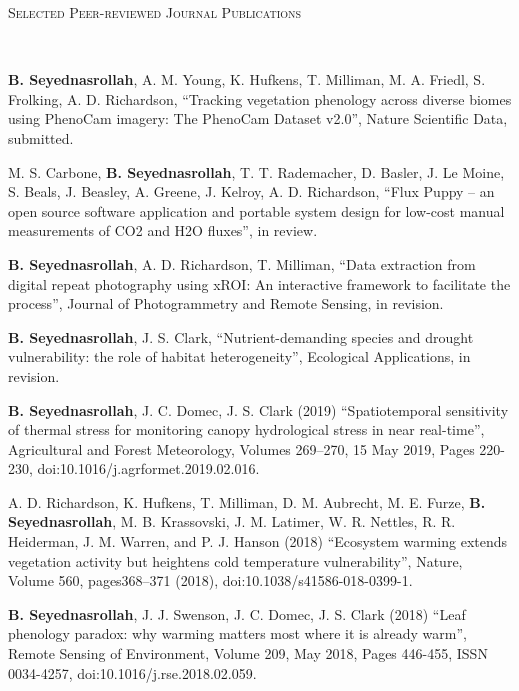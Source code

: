 \documentclass[10pt]{article}
\newenvironment{changemargin}[2]{%
  \begin{list}{}{%
    \setlength{\topsep}{0pt}%
    \setlength{\leftmargin}{#1}%
    \setlength{\rightmargin}{#2}%
    \setlength{\listparindent}{\parindent}%
    \setlength{\itemindent}{\parindent}%
    \setlength{\parsep}{\parskip}%
  }%
  \item[]}{\end{list}
}
\newcommand{\lineover}{
	\begin{changemargin}{-0.05in}{-0.05in}
		\vspace*{-8pt}
		\hrulefill \\
		\vspace*{-2pt}
	\end{changemargin}
}
\newcommand{\header}[1]{
	\begin{changemargin}{-0.5in}{-0.5in}
		\scshape{#1}\\
  	\lineover
	\end{changemargin}
}
\newenvironment{body} {
	\vspace*{-2pt}
	\begin{changemargin}{-0.5in}{-0.5in}
  }
	{\end{changemargin}
}
\begin{document}
\medskip
\header{Selected Peer-reviewed Journal Publications}

\begin{body}
\medskip


\textbf{B. Seyednasrollah}, A. M. Young, K. Hufkens, T. Milliman, M. A. Friedl, S. Frolking, A. D. Richardson, ``Tracking vegetation phenology across diverse biomes using PhenoCam imagery: The PhenoCam Dataset v2.0'', Nature Scientific Data, submitted.\\
\medskip

M. S. Carbone, \textbf{B. Seyednasrollah}, T. T. Rademacher, D. Basler, J. Le Moine, S. Beals, J. Beasley, A. Greene, J. Kelroy, A. D. Richardson, ``Flux Puppy – an open source software application and portable system design for low-cost manual measurements of CO2 and H2O fluxes'', in review.\\
\medskip

	\textbf{B. Seyednasrollah}, A. D. Richardson, T. Milliman, ``Data extraction from digital repeat photography using xROI: An interactive framework to facilitate the process'', Journal of Photogrammetry and Remote Sensing, in revision.\\
\medskip

	\textbf{B. Seyednasrollah}, J. S. Clark, ``Nutrient-demanding species and drought vulnerability: the role of habitat heterogeneity'', Ecological Applications, in revision.\\
\medskip

	\textbf{B. Seyednasrollah}, J. C. Domec, J. S. Clark (2019) ``Spatiotemporal sensitivity of thermal stress for monitoring canopy hydrological stress in near real-time'', Agricultural and Forest Meteorology, Volumes 269–270, 15 May 2019, Pages 220-230, doi:10.1016/j.agrformet.2019.02.016.\\
\medskip


	A. D. Richardson, K. Hufkens, T. Milliman, D. M. Aubrecht, M. E. Furze, \textbf{B. Seyednasrollah}, M. B. Krassovski, J. M. Latimer, W. R. Nettles, R. R. Heiderman, J. M. Warren, and P. J. Hanson (2018) ``Ecosystem warming extends vegetation activity but heightens cold temperature vulnerability'', Nature, Volume 560, pages368–371 (2018), doi:10.1038/s41586-018-0399-1.\\
\medskip

	\textbf{B. Seyednasrollah}, J. J. Swenson, J. C. Domec, J. S. Clark (2018) ``Leaf phenology paradox: why warming matters most where it is already warm'', Remote Sensing of Environment, Volume 209, May 2018, Pages 446-455, ISSN 0034-4257, doi:10.1016/j.rse.2018.02.059.\\
\medskip


\end{body}
\end{document}
